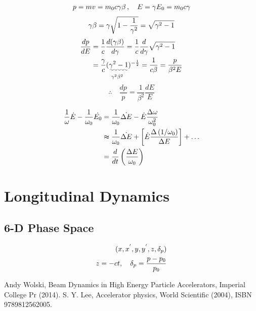 \documentclass[10pt,a4paper]{ltjsarticle}
\begin{document}
\begin{tcolorbox}[title=式 (\ref{delta_p}) の導出]
    
    \begin{align}
        p = mv = m_0 c \gamma \beta \,  , \quad E = \gamma E_0 = m_0 c \gamma \notag
    \end{align}
    \begin{equation}
        \gamma \beta = \gamma \sqrt{1-\frac{1}{\gamma^2}} \notag = \sqrt{\gamma^2 -1} \notag
    \end{equation}
    \begin{align}
        \frac{dp}{dE} & = \frac{1}{c}\frac{d(\gamma \beta)}{d\gamma} = \frac{1}{c}\frac{d}{d\gamma}\sqrt{\gamma^2 -1} \notag \\
        & = \frac{\gamma}{c} \underset{\gamma^2\beta^2}{(\uwave{\gamma^2 -1}})^{-\frac{1}{2}} = \frac{1}{c\beta}
        = \frac{p}{\beta^2 E}\notag
    \end{align}
    \begin{equation}
        \therefore \quad \frac{dp}{p} = \frac{1}{\beta^2}\frac{dE}{E} \tag{C.1}
    \end{equation}
\end{tcolorbox}
%
\begin{tcolorbox}[title=スムーズ近似]
    \begin{align}
        \frac{1}{\omega} \dot{E} - \frac{1}{\omega_0} \dot{E_0}
        & = \frac{1}{\omega_0} \dot{\Delta E} - \dot{E}\frac{\Delta \omega}{\omega_0^2} \notag \\
        & \thickapprox \frac{1}{\omega_0} \dot{\Delta E} + \left[\dot{E}\frac{\Delta \left(1 / \omega_0\right)}{\Delta E} \right] + \dots \notag \\
        & = \frac{d}{dt}\left(\frac{\Delta E}{\omega_0}\right) \notag
    \end{align}
\end{tcolorbox}
%
\section{Longitudinal Dynamics}
\subsection{6-D Phase Space}
\begin{align}
    (x, x^{'}, y, y^{'}, z, \delta_p) \notag \\
    z = -ct, \quad \delta_p =\frac{p-p_0}{p_0} \notag
\end{align}
%
\begin{thebibliography}{9}
    Andy Wolski, Beam Dynamics in High Energy Particle Accelerators,  Imperial College Pr (2014).
    S. Y. Lee, Accelerator physics, World Scientific (2004), ISBN 9789812562005.
\end{thebibliography}
\end{document}
